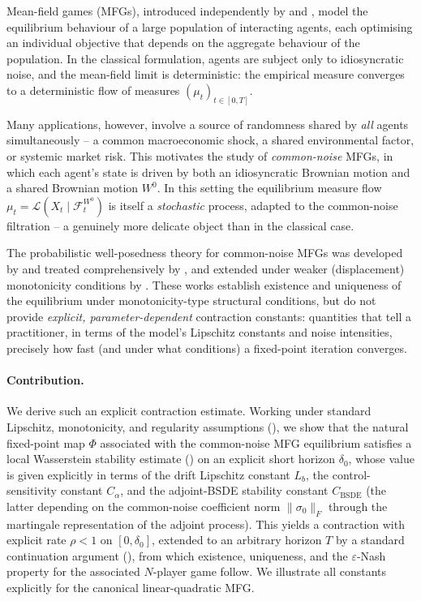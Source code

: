 \documentclass[11pt]{article}
\theoremstyle{remark}
\begin{document}
Mean-field games (MFGs), introduced independently by \citet{lasrylions2007} and
\citet{huangetal2006}, model the equilibrium behaviour of a large population of
interacting agents, each optimising an individual objective that depends on the
aggregate behaviour of the population. In the classical formulation, agents are subject
only to idiosyncratic noise, and the mean-field limit is deterministic: the empirical
measure converges to a deterministic flow of measures $(\mu_t)_{t\in[0,T]}$.

Many applications, however, involve a source of randomness shared by \emph{all}
agents simultaneously -- a common macroeconomic shock, a shared environmental factor,
or systemic market risk. This motivates the study of \emph{common-noise} MFGs, in
which each agent's state is driven by both an idiosyncratic Brownian motion and a
shared Brownian motion $W^0$. In this setting the equilibrium measure flow
$\mu_t = \mathcal{L}(X_t \mid \mathcal{F}_t^{W^0})$ is itself a \emph{stochastic}
process, adapted to the common-noise filtration -- a genuinely more delicate object
than in the classical case.

The probabilistic well-posedness theory for common-noise MFGs was developed by
\citet{carmona2013probabilistic} and treated comprehensively by
\citet{carmonadelarue2018}, and extended under weaker (displacement) monotonicity
conditions by \citet{ahujarenyang2019}. These works establish existence and uniqueness
of the equilibrium under monotonicity-type structural conditions, but do not provide
\emph{explicit, parameter-dependent} contraction constants: quantities that tell a
practitioner, in terms of the model's Lipschitz constants and noise intensities,
precisely how fast (and under what conditions) a fixed-point iteration converges.

\paragraph{Contribution.} We derive such an explicit contraction estimate. Working
under standard Lipschitz, monotonicity, and regularity assumptions (),
we show that the natural fixed-point map $\Phi$ associated with the common-noise MFG
equilibrium satisfies a local Wasserstein stability estimate ()
on an explicit short horizon $\delta_0$, whose value is given explicitly in terms of
the drift Lipschitz constant $L_b$, the control-sensitivity constant $C_\alpha$, and
the adjoint-BSDE stability constant $C_{\mathrm{BSDE}}$ (the latter depending on the
common-noise coefficient norm $\|\sigma_0\|_F$ through the martingale representation
of the adjoint process). This yields a contraction with explicit rate $\rho<1$ on
$[0,\delta_0]$, extended to an arbitrary horizon $T$ by a standard continuation
argument (), from which existence, uniqueness, and the
$\varepsilon$-Nash property for the associated $N$-player game follow. We illustrate
all constants explicitly for the canonical linear-quadratic MFG.
\end{document}
